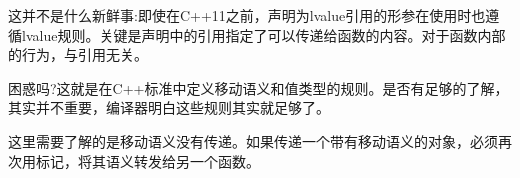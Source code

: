 这并不是什么新鲜事:即使在C++11之前，声明为lvalue引用的形参在使用时也遵循lvalue规则。关键是声明中的引用指定了可以传递给函数的内容。对于函数内部的行为，与引用无关。

困惑吗?这就是在C++标准中定义移动语义和值类型的规则。是否有足够的了解，其实并不重要，编译器明白这些规则其实就足够了。

这里需要了解的是移动语义没有传递。如果传递一个带有移动语义的对象，必须再次用标记，将其语义转发给另一个函数。











































